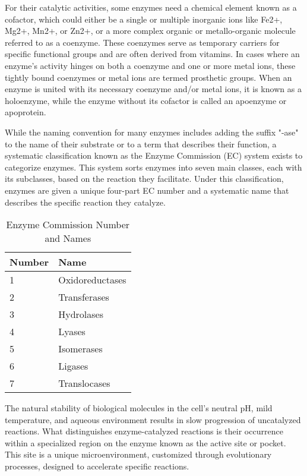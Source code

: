 For their catalytic activities, some enzymes need a chemical element known as a cofactor, which could either be a single or multiple inorganic ions like Fe2+, Mg2+, Mn2+, or Zn2+, or a more complex organic or metallo-organic molecule referred to as a coenzyme. These coenzymes serve as temporary carriers for specific functional groups and are often derived from vitamins. In cases where an enzyme's activity hinges on both a coenzyme and one or more metal ions, these tightly bound coenzymes or metal ions are termed prosthetic groups. When an enzyme is united with its necessary coenzyme and/or metal ions, it is known as a holoenzyme, while the enzyme without its cofactor is called an apoenzyme or apoprotein.

While the naming convention for many enzymes includes adding the suffix "-ase" to the name of their substrate or to a term that describes their function, a systematic classification known as the Enzyme Commission (EC) system exists to categorize enzymes. This system sorts enzymes into seven main classes, each with its subclasses, based on the reaction they facilitate. Under this classification, enzymes are given a unique four-part EC number and a systematic name that describes the specific reaction they catalyze.

\begin{table}[h!]
  \centering
  \begin{tabular}{ll}
  \hline
  \textbf{Number} & \textbf{Name} \\
  \hline
  1 & Oxidoreductases \\
  \hline
  2 & Transferases \\
  \hline
  3 & Hydrolases \\
  \hline
  4 & Lyases \\
  \hline
  5 & Isomerases \\
  \hline
  6 & Ligases \\
  \hline
  7 & Translocases \\
  \hline
  \end{tabular}
  \caption{Enzyme Commission Number and Names}
  \label{table:enzyme_names}
  \end{table}  

The natural stability of biological molecules in the cell's neutral pH, mild temperature, and aqueous environment results in slow progression of uncatalyzed reactions. What distinguishes enzyme-catalyzed reactions is their occurrence within a specialized region on the enzyme known as the active site or pocket. This site is a unique microenvironment, customized through evolutionary processes, designed to accelerate specific reactions.


